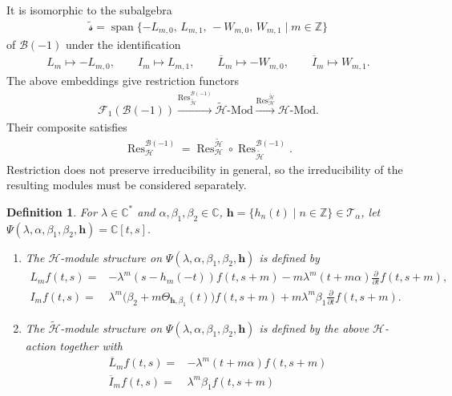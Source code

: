 \documentclass[a4paper]{amsart}
\numberwithin{equation}{section}
\newtheorem{definition}[theorem]{Definition}
\begin{document}
It is isomorphic to the subalgebra
\begin{align*}
\widetilde{\mathcal{s}}
=
\operatorname{span}\{-L_{m,0},\,L_{m,1},\,-W_{m,0},\,W_{m,1}\mid m\in\mathbb Z\}
\end{align*}
of $\mathcal B(-1)$ under the identification
\begin{align*}
L_m\mapsto -L_{m,0},\qquad I_m\mapsto L_{m,1},\qquad
\overline{L}_m\mapsto -W_{m,0},\qquad \overline{I}_m\mapsto W_{m,1}.
\end{align*}
The above embeddings give restriction functors
\begin{align*}
\mathcal F_1(\mathcal B(-1))
\xrightarrow{\operatorname{Res}^{\mathcal B(-1)}_{\widetilde{\mathcal H}}}
\widetilde{\mathcal H}\text{-}\mathrm{Mod}
\xrightarrow{\operatorname{Res}^{\widetilde{\mathcal H}}_{\mathcal H}}
\mathcal H\text{-}\mathrm{Mod}.
\end{align*}
Their composite satisfies
\begin{align*}
\operatorname{Res}^{\mathcal B(-1)}_{\mathcal H}
=
\operatorname{Res}^{\widetilde{\mathcal H}}_{\mathcal H}
\circ
\operatorname{Res}^{\mathcal B(-1)}_{\widetilde{\mathcal H}}.
\end{align*}
Restriction does not preserve irreducibility in general, so the irreducibility of the resulting modules must be considered separately.
\begin{definition}\label{def5.1}
For $\lambda\in\mathbb C^*$ and $\alpha,\beta_1,\beta_2\in\mathbb C$, $\mathbf{h}=\{h_{n}(t)\mid n\in\mathbb{Z}\}\in\mathcal{T}_{\alpha}$, let
$\Psi(\lambda,\alpha,\beta_1,\beta_2,\mathbf h)=\mathbb C[t,s]$.

\begin{enumerate}
    \item The $\mathcal{H}$-module structure on $\Psi(\lambda,\alpha,\beta_1,\beta_2,\mathbf h)$ is defined by
    \begin{align*}
	         L_{m} f(t,s)=&-\lambda^{m}(s- h_{m}(-t))f(t,s+m)-m\lambda^{m}(t+m \alpha)\frac{\partial}{\partial t}f(t,s+m),\\
	     I_{m} f(t,s)=& \lambda^{m}\bigl(\beta_{2}+m\Theta_{\mathbf h,\beta_1}(t)\bigr)f(t,s+m)
	     +m\lambda^{m}\beta_{1}\frac{\partial}{\partial t}f(t,s+m).
	    \end{align*}

    \item The $\widetilde{\mathcal{H}}$-module structure on $\Psi(\lambda,\alpha,\beta_1,\beta_2,\mathbf h)$ is defined by the above $\mathcal{H}$-action together with
     \begin{align*}
	        \overline{L}_m f(t,s)=&-\lambda^{m}(t+m\alpha)f(t,s+m)\\
	        \overline{I}_m f(t,s)=&\lambda^{m}\beta_{1}f(t,s+m)
	    \end{align*}
\end{enumerate}
\end{definition}
\end{document}
